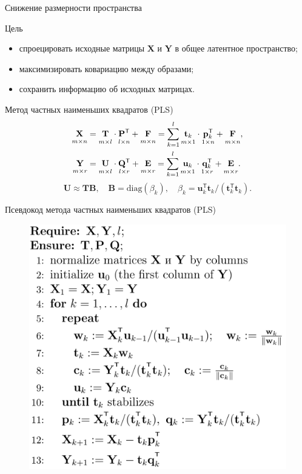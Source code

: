 \documentclass[9pt]{beamer}
\newcommand{\bY}{\mathbf{Y}}
\newcommand{\bX}{\mathbf{X}}
\newcommand{\bu}{\mathbf{u}}
\newcommand{\bt}{\mathbf{t}}
\newcommand{\bp}{\mathbf{p}}
\newcommand{\bq}{\mathbf{q}}
\newcommand{\bP}{\mathbf{P}}
\newcommand{\bT}{\mathbf{T}}
\newcommand{\bB}{\mathbf{B}}
\newcommand{\bQ}{\mathbf{Q}}
\newcommand{\bE}{\mathbf{E}}
\newcommand{\bF}{\mathbf{F}}
\newcommand{\bU}{\mathbf{U}}
\newcommand{\T}{\mathsf{T}}
\begin{document}
\begin{frame}{Снижение размерности пространства}
\begin{block}{Цель}
	\begin{itemize}
		\item спроецировать исходные матрицы $\bX$ и $\bY$ в общее латентное пространство;
		\item максимизировать ковариацию между образами;
		\item сохранить информацию об исходных матрицах.
	\end{itemize}
\end{block}
\begin{block}{Метод частных наименьших квадратов (PLS)}
	\vspace{-0.5cm}
\begin{align*}
\underset{m \times n}{\vphantom{\bQ}\bX} 
&= \underset{m \times l}{\vphantom{\bQ}\bT} \cdot \underset{l \times n}{\vphantom{\bQ}\bP^{\T}} + \underset{m \times n}{\vphantom{\bQ}\bF} 
= \sum_{k=1}^l \underset{m \times 1}{\vphantom{\bp_k^{\T}}\bt_k} \cdot \underset{1 \times n}{\bp_k^{\T}} + \underset{m \times n}{\vphantom{\bp_k^{\T}}\bF},\\
\underset{m \times r}{\vphantom{\bQ}\bY} 
&= \underset{m \times l}{\vphantom{\bQ}\bU} \cdot \underset{l \times r}{\bQ^{\T}} + \underset{m \times r}{\vphantom{\bQ}\bE}
=  \sum_{k=1}^l  \underset{m \times 1}{\vphantom{\bq_k^{\T}}\bu_k} \cdot \underset{1 \times r}{\bq_k^{\T}} +  \underset{m \times r}{\vphantom{\bq_k^{\T}}\bE}.
\end{align*}
\begin{equation*}
\bU \approx \bT \bB, \quad \bB = \text{diag}(\beta_k), \quad \beta_k = \bu_k^{\T}\bt_k / (\bt_k^{\T}\bt_k).
\end{equation*}
\end{block}

\end{frame}
\begin{frame}{Псевдокод метода частных наименьших квадратов (PLS)}

\begin{figure}
\begin{flushleft}
	\includegraphics[width=0.6\linewidth]{figs/pls_pseudocode}
\end{flushleft}
\end{figure}
\end{frame}
\end{document}
